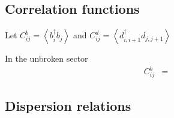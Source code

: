 \documentclass[12pt]{article}
\newcommand{\ex}[1]{\left\langle#1\right\rangle}
\begin{document}
\subsection{Correlation functions}

Let $C_{ij}^b = \ex{b^\dag_ib_j}$ and $C_{ij}^d = \ex{d^\dag_{i,i+1}d_{j,j+1}}$

In the unbroken sector
\begin{align}
C_{ij}^b &= 
\end{align}

\subsection{Dispersion relations}






\end{document}
